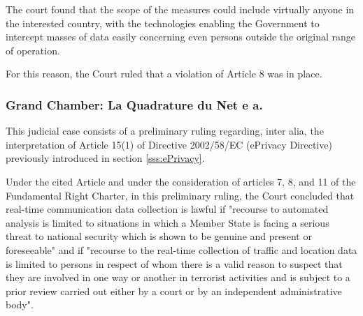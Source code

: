 The court found that the scope of the measures could include virtually anyone in the interested country, with the technologies enabling the Government to intercept masses of data easily concerning even persons outside the original range of operation.

For this reason, the Court ruled that a violation of Article 8 was in place.

\subsubsection{Grand Chamber: La Quadrature du Net e a.}
\label{sss:quad}

This judicial case consists of a preliminary ruling regarding, inter alia, the interpretation of Article 15(1) of Directive 2002/58/EC (ePrivacy Directive) previously introduced in section \ref{sss:ePrivacy}.

Under the cited Article and under the consideration of articles 7, 8, and 11 of the Fundamental Right Charter, in this preliminary ruling, the Court concluded that real-time communication data collection is lawful if "recourse to automated analysis is limited to situations in which a Member State is facing a serious threat to national security which is shown to be genuine and present or foreseeable" and if "recourse to the real-time collection of traffic and location data is limited to persons in respect of whom there is a valid reason to suspect that they are involved in one way or another in terrorist activities and is subject to a prior review carried out either by a court or by an independent administrative body"\cite{Grand_chamber}.

